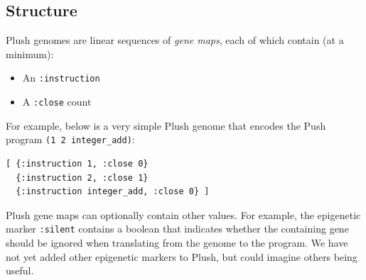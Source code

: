 \documentclass[graybox]{svmult}
\begin{document}

\subsection{Structure}
Plush genomes are linear sequences of \textit{gene maps}, each of which contain (at a minimum):
\begin{itemize}
  \item An \texttt{:instruction}
  \item A \texttt{:close} count
\end{itemize}
For example, below is a very simple Plush genome that encodes the Push program \texttt{(1 2 integer\_add)}:

\begin{verbatim}
[ {:instruction 1, :close 0}
  {:instruction 2, :close 1}
  {:instruction integer_add, :close 0} ]
\end{verbatim}

Plush gene maps can optionally contain other values. For example, the
epigenetic marker \texttt{:silent} contains a boolean that indicates whether the containing gene should be ignored when
translating from the genome to the program. We have not yet added other epigenetic markers to Plush, but could imagine others being useful.
\end{document}
